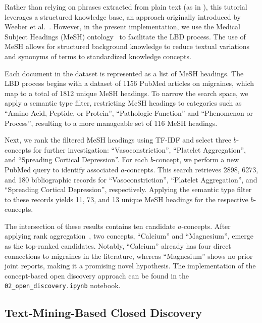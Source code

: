 \documentclass[runningheads]{llncs}
\begin{document}
Rather than relying on phrases extracted from plain text (as in ), this tutorial leverages a structured knowledge base, an approach originally introduced by Weeber et al.~\cite{weeber2001using}. However, in the present implementation, we use the Medical Subject Headings (MeSH) ontology~\cite{lipscomb2000medical} to facilitate the LBD process. The use of MeSH allows for structured background knowledge to reduce textual variations and synonyms of terms to standardized knowledge concepts.

Each document in the dataset is represented as a list of MeSH headings. The LBD process begins with a dataset of 1156 PubMed articles on migraines, which map to a total of 1812 unique MeSH headings. To narrow the search space, we apply a semantic type filter, restricting MeSH headings to categories such as ``Amino Acid, Peptide, or Protein'', ``Pathologic Function'' and ``Phenomenon or Process'', resulting to a more manageable set of 116 MeSH headings.

Next, we rank the filtered MeSH headings using TF-IDF and select three $b$-concepts for further investigation: ``Vasoconstriction'', ``Platelet Aggregation'', and ``Spreading Cortical Depression''. For each $b$-concept, we perform a new PubMed query to identify associated $a$-concepts. This search retrieves 2898, 6273, and 180 bibliographic records for ``Vasoconstriction'', ``Platelet Aggregation'', and ``Spreading Cortical Depression'', respectively. Applying the semantic type filter to these records yields 11, 73, and 13 unique MeSH headings for the respective $b$-concepts.

The intersection of these results contains ten candidate $a$-concepts. After applying rank aggregation~\cite{kolde2012robust}, two concepts, ``Calcium'' and ``Magnesium'', emerge as the top-ranked candidates. Notably, ``Calcium'' already has four direct connections to migraines in the literature, whereas ``Magnesium'' shows no prior joint reports, making it a promising novel hypothesis. The implementation of the concept-based open discovery approach can be found in the \texttt{02\_open\_discovery.ipynb} notebook.

\subsection{Text-Mining-Based Closed Discovery}
\label{sec:text_based}
\end{document}
